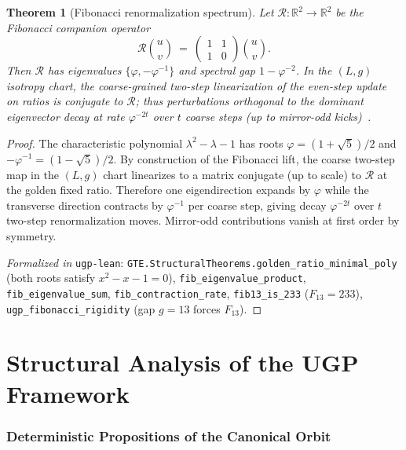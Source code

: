 \documentclass[12pt]{article}
\newtheorem{theorem}{Theorem}[section]
\numberwithin{equation}{section}
\newcommand{\R}{\mathbb{R}}
\begin{document}
\begin{theorem}[Fibonacci renormalization spectrum]\label{thm:fib-spectrum}
Let $\mathcal{R}:\R^2\to\R^2$ be the Fibonacci companion operator
\[
\mathcal{R}\binom{u}{v}\ =\ \begin{pmatrix}1&1\\[2pt]1&0\end{pmatrix}\binom{u}{v}.
\]
Then $\mathcal{R}$ has eigenvalues $\{\varphi,-\varphi^{-1}\}$ and spectral gap $1-\varphi^{-2}$. In the $(L,g)$ isotropy chart, the coarse-grained two-step linearization of the even-step update on ratios is conjugate to $\mathcal{R}$; thus perturbations orthogonal to the dominant eigenvector decay at rate $\varphi^{-2t}$ over $t$ coarse steps (up to mirror-odd kicks)~\cite{SpivackUGPFormalization,ugp-lean}.
\end{theorem}

\begin{proof}
The characteristic polynomial $\lambda^2-\lambda-1$ has roots $\varphi=(1+\sqrt5)/2$ and $-\varphi^{-1}=(1-\sqrt5)/2$. By construction of the Fibonacci lift, the coarse two-step map in the $(L,g)$ chart linearizes to a matrix conjugate (up to scale) to $\mathcal{R}$ at the golden fixed ratio. Therefore one eigendirection expands by $\varphi$ while the transverse direction contracts by $\varphi^{-1}$ per coarse step, giving decay $\varphi^{-2t}$ over $t$ two-step renormalization moves. Mirror-odd contributions vanish at first order by symmetry.

\noindent\emph{Formalized in} \texttt{ugp-lean}: \texttt{GTE.StructuralTheorems.golden\_ratio\_minimal\_poly} (both roots satisfy $x^2-x-1=0$), \texttt{fib\_eigenvalue\_product}, \texttt{fib\_eigenvalue\_sum}, \texttt{fib\_contraction\_rate}, \texttt{fib13\_is\_233} ($F_{13}=233$),
\texttt{ugp\_fibonacci\_rigidity} (gap $g=13$ forces $F_{13}$).
\end{proof}



\part{Structural Analysis of the UGP Framework}

\section{Deterministic Propositions of the Canonical Orbit}\label{sec:surviving-props}
\end{document}
